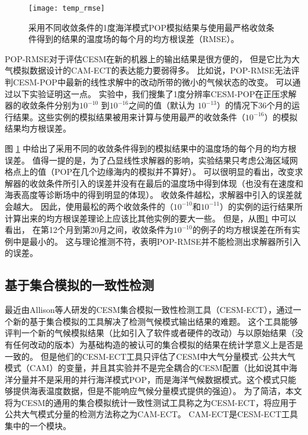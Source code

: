 \begin{figure}%
\begin{center}
\texttt{[image: temp\_rmse]}
\end{center}
\caption[] {采用不同收敛条件的1度海洋模式POP模拟结果与使用最严格收敛条件得到的结果的温度场的每个月的均方根误差（RMSE）。}
\label{fig:ssh_rmse_t}
\end{figure}

POP-RMSE对于评估CESM在新的机器上的输出结果是很方便的， 但是它比为大气模拟数据设计的CAM-ECT的表达能力要弱得多。 
比如说，POP-RMSE无法评判CESM-POP中最新的线性求解中的改动所带的微小的气候状态的改变\cite{yong2015}。 
可以通过以下实验证明这一点。
实验中，我们搜集了1度分辨率CESM-POP在正压求解器的收敛条件分别为$10^{-10}$ 到$10^{-16}$之间的值（默认为 $10^{-13}$）的情况下36个月的运行结果。这些实例的模拟结果被用来计算与使用最严的收敛条件（$10^{-16}$）的模拟结果均方根误差。 

图 \ref{fig:ssh_rmse_t} 中给出了采用不同的收敛条件得到的模拟结果中的温度场的每个月的均方根误差。 
值得一提的是，为了凸显线性求解器的影响，实验结果只考虑公海区域网格点上的值（POP在几个边缘海内的模拟并不算好）。 
可以很明显的看出，改变求解器的收敛条件所引入的误差并没有在最后的温度场中得到体现（也没有在速度和海表高度等诊断场中的得到明显的体现）。 
收敛条件越松，求解器中引入的误差就会越大。
因此，使用最松的两个收敛条件的（$10^{-10}$和$10^{-11}$）的实例的运行结果所计算出来的均方根误差理论上应该比其他实例的要大一些。 
但是，从图\ref{fig:ssh_rmse_t} 中可以看出， 
在第12个月到第20月之间，收敛条件为$10^{-10}$的例子的均方根误差在所有实例中是最小的。  
这与理论推测不符，表明POP-RMSE并不能检测出求解器所引入的误差。

 
\subsection{基于集合模拟的一致性检测}
\label{verify:enseble}

最近由Allison等人\cite{baker2015}研发的CESM集合模拟一致性检测工具（CESM-ECT），通过一个新的基于集合模拟的工具解决了检测气候模式输出结果的难题。 
这个工具能够评判一个新的气候模拟结果（比如引入了软件或者硬件的改动）与以原始结果（没有任何改动的版本）为基础构造的被认可的集合模拟的结果在统计学意义上是否是一致的。 
但是他们的CESM-ECT工具只评估了CESM中大气分量模式--公共大气模式（CAM）的变量，并且其实验并不是完全耦合的CESM配置（比如说其中海洋分量并不是采用的并行海洋模式POP，而是海洋气候数据模式。这个模式只能够提供海表温度数据，但是不能响应气候分量模式提供的强迫）。 
为了简洁，本文将为CESM的通用的集合模拟统计一致性测试工具称之为CESM-ECT，将应用于公共大气模式分量的检测方法称之为CAM-ECT。
CAM-ECT是CESM-ECT工具集中的一个模块。 

